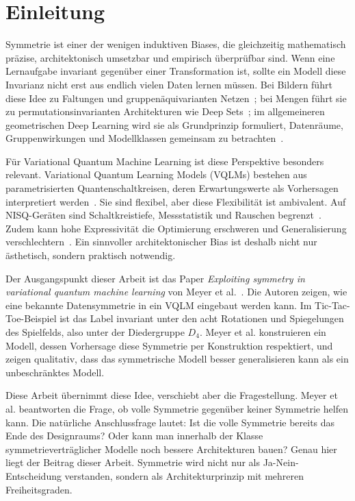 \section{Einleitung}\label{sec:einleitung}

Symmetrie ist einer der wenigen induktiven Biases, die gleichzeitig mathematisch präzise, architektonisch umsetzbar und empirisch überprüfbar sind. Wenn eine Lernaufgabe invariant gegenüber einer Transformation ist, sollte ein Modell diese Invarianz nicht erst aus endlich vielen Daten lernen müssen. Bei Bildern führt diese Idee zu Faltungen und gruppenäquivarianten Netzen~\cite{lecun1998gradient,cohen2016group}; bei Mengen führt sie zu permutationsinvarianten Architekturen wie Deep Sets~\cite{zaheer2017deep}; im allgemeineren geometrischen Deep Learning wird sie als Grundprinzip formuliert, Datenräume, Gruppenwirkungen und Modellklassen gemeinsam zu betrachten~\cite{bronstein2021geometric}.

Für Variational Quantum Machine Learning ist diese Perspektive besonders relevant. Variational Quantum Learning Models (VQLMs) bestehen aus parametrisierten Quantenschaltkreisen, deren Erwartungswerte als Vorhersagen interpretiert werden~\cite{benedetti2019parameterized,schuld2020circuit}. Sie sind flexibel, aber diese Flexibilität ist ambivalent. Auf NISQ-Geräten sind Schaltkreistiefe, Messstatistik und Rauschen begrenzt~\cite{preskill2018quantum,bharti2022noisy}. Zudem kann hohe Expressivität die Optimierung erschweren und Generalisierung verschlechtern~\cite{mcclean2018barren,pesah2021absence}. Ein sinnvoller architektonischer Bias ist deshalb nicht nur ästhetisch, sondern praktisch notwendig.

Der Ausgangspunkt dieser Arbeit ist das Paper \emph{Exploiting symmetry in variational quantum machine learning} von Meyer et al.~\cite{meyer2022exploiting}. Die Autoren zeigen, wie eine bekannte Datensymmetrie in ein VQLM eingebaut werden kann. Im Tic-Tac-Toe-Beispiel ist das Label invariant unter den acht Rotationen und Spiegelungen des Spielfelds, also unter der Diedergruppe $D_4$. Meyer et al. konstruieren ein Modell, dessen Vorhersage diese Symmetrie per Konstruktion respektiert, und zeigen qualitativ, dass das symmetrische Modell besser generalisieren kann als ein unbeschränktes Modell.

Diese Arbeit übernimmt diese Idee, verschiebt aber die Fragestellung. Meyer et al. beantworten die Frage, ob volle Symmetrie gegenüber keiner Symmetrie helfen kann. Die natürliche Anschlussfrage lautet: Ist die volle Symmetrie bereits das Ende des Designraums? Oder kann man innerhalb der Klasse symmetrieverträglicher Modelle noch bessere Architekturen bauen? Genau hier liegt der Beitrag dieser Arbeit. Symmetrie wird nicht nur als Ja-Nein-Entscheidung verstanden, sondern als Architekturprinzip mit mehreren Freiheitsgraden.

